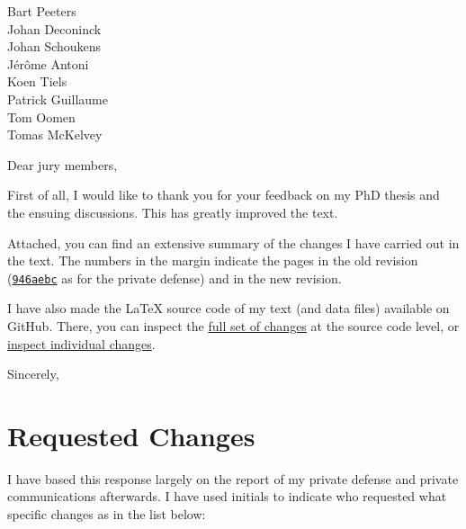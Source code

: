 \documentclass{responseletter}
\date{\today}
\begin{document}
\begin{letter}{%
Bart Peeters \\
Johan Deconinck \\
Johan Schoukens \\
Jérôme Antoni \\
Koen Tiels \\
Patrick Guillaume \\
Tom Oomen \\
Tomas McKelvey 
}

\opening{Dear jury members,}

First of all, I would like to thank you for your feedback on my PhD thesis and the ensuing discussions.
This has greatly improved the text.

Attached, you can find an extensive summary of the changes I have carried out in the text.
The numbers in the margin indicate the pages in the old revision (\href{https://github.com/egeerardyn/phdthesis/releases/tag/private-submit}{\texttt{946aebc}} as for the private defense) and in the new revision.

I have also made the \LaTeX{} source code of my text (and data files) available on GitHub.
There, you can inspect the \href{https://github.com/egeerardyn/phdthesis/compare/b6b273e...master}{full set of changes} at the source code level, or \href{https://github.com/egeerardyn/phdthesis/commits/master}{inspect individual changes}.

\closing{Sincerely,}
\end{letter}


\section{Requested Changes}

I have based this response largely on the report of my private defense and private communications afterwards. 
I have used initials to indicate who requested what specific changes as in the list below:
\end{document}

